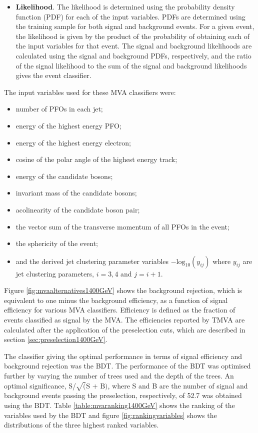 \begin{itemize}
\item \textbf{Likelihood}.  The likelihood is determined using the probability density function (PDF) for each of the input variables.  PDFs are determined using the training sample for both signal and background events.  For a given event, the likelihood is given by the product of the probability of obtaining each of the input variables for that event.  The signal and background likelihoods are calculated using the signal and background PDFs{,} respectively{,} and the ratio of the signal likelihood to the sum of the signal and background likelihoods gives the event classifier.   
\end{itemize}

The input variables used for these MVA classifiers were:
\begin{itemize}
\item number of PFOs in each jet;
\item energy of the highest energy PFO;
\item energy of the highest energy electron;
\item cosine of the polar angle of the highest energy track;
\item energy of the candidate bosons;
\item invariant mass of the candidate bosons;
\item acolinearity of the candidate boson pair;
\item the vector sum of the transverse momentum of all PFOs in the event;
\item the sphericity of the event;
\item and the derived jet clustering parameter variables $-\text{log}_{10}(y_{ij})$ where $y_{ij}$ are jet clustering parameters, $i = 3,4$ and $j=i+1$.  
\end{itemize}

Figure \ref{fig:mvaalternatives1400GeV} shows the background rejection, which is equivalent to one minus the background efficiency, as a function of signal efficiency for various MVA classifiers.  Efficiency is defined as the fraction of events classified as signal by the MVA.  The efficiencies reported by TMVA are calculated after the application of the preselection cuts, which are described in section \ref{sec:preselection1400GeV}.  

The classifier giving the optimal performance in terms of signal efficiency and background rejection was the BDT.  The performance of the BDT was optimised further by varying the number of trees used and the depth of the trees.  An optimal significance, S/$\sqrt(\text{S + B})$, where S and B are the number of signal and background events passing the preselection{,} respectively, of 52.7 was obtained using the BDT.  {Table \ref{table:mvaranking1400GeV} shows the ranking of the variables used by the BDT and figure \ref{fig:rankingvariables} shows the distributions of the three highest ranked variables.}

